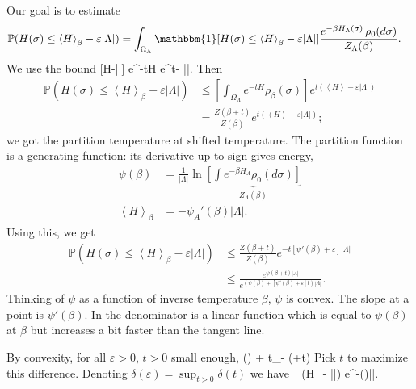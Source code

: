 \documentclass[12pt]{book}
\theoremstyle{norm}
\begin{document}
Our goal is to estimate 
\begin{align*}
\mathbb{P}(H(\sigma)\le \left\langle {H}\right\rangle_\beta - \varepsilon |\Lambda|)
&=\int_{\Omega_\Lambda} \mathbbm{1}[H(\sigma)\le \left\langle {H}\right\rangle_\beta - \varepsilon |\Lambda|] \frac{e^{-\beta H_\Lambda(\sigma)}\,\rho_0(d\sigma)}{Z_{\Lambda}(\beta)}.
\end{align*}
We use the bound 
\be
{}[H\le \left{}\right\rangle-\varepsilon |\Lambda|] \le e^{-tH} e^{t\left{}\right\rangle - \varepsilon|\Lambda|}.
\ee
Then 
\begin{align*}
\mathbb{P}(H(\sigma)\le \left\langle {H}\right\rangle_\beta - \varepsilon |\Lambda|)
&\le \left[ {\int_{\Omega_\Lambda} e^{-tH}\rho_{\beta}(\sigma)} \right] e^{t(\left\langle {H}\right\rangle-\varepsilon|\Lambda|)}\\
&= \frac{Z(\beta+t)}{Z(\beta)}e^{t(\left\langle {H}\right\rangle-\varepsilon|\Lambda|)};
\end{align*}
we got the partition temperature at shifted temperature.
The partition function is a generating function: its derivative up to sign gives energy,
\begin{align*}
\psi(\beta) &= \frac{1}{|\Lambda|}\ln \underbrace{\left[ { \int e^{-\beta H_\Lambda} \rho_0(d\sigma)} \right]}_{Z_{\Lambda}(\beta)}\\
\left\langle {H}\right\rangle_\beta &= -\psi_A'(\beta) |\Lambda|.
\end{align*}
Using this, we get
\begin{align*}
\mathbb{P}(H(\sigma)\le \left\langle {H}\right\rangle_\beta - \varepsilon |\Lambda|)&\le 
\frac{Z(\beta+t)}{Z(\beta)}e^{-t[\psi'(\beta)+\varepsilon]|\Lambda|}\\
&\le \frac{e^{\psi(\beta+t)|\Lambda|}}{e^{(\psi(\beta) + [\psi'(\beta) + \varepsilon]t)|\Lambda|}}.%
\end{align*}
Thinking of $\psi$ as a function of inverse temperature $\beta$, $\psi$ is convex. The slope at a point is $\psi'(\beta)$. In the denominator is a linear function which is equal to $\psi(\beta)$ at $\beta$ but increases a bit faster than the tangent line.

By convexity, for all $\varepsilon>0$, $t>0$ small enough, %
\be
\psi(\beta) + t_ - \psi(\beta+t) 
\ee
Pick $t$ to maximize this difference. Denoting $\delta(\varepsilon)=\sup_{t>0}\delta(t)$ we have
\be
{}_\beta (H_\Lambda\le \left{}\right\rangle - \varepsilon|\Lambda|) \le e^{-\delta (\varepsilon)|\Lambda|}.
\ee
\end{document}

